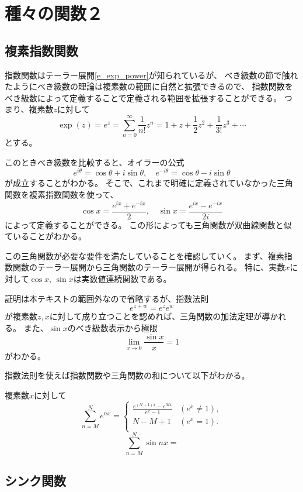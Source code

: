 
\chapter{種々の関数２}

\section{複素指数関数}

指数関数はテーラー展開\eqref{e_exp_power}が知られているが、
べき級数の節で触れたようにべき級数の理論は複素数の範囲に自然と拡張できるので、
指数関数をべき級数によって定義することで定義される範囲を拡張することができる。
つまり、複素数$z$に対して
$$
\exp(z) = e^z = \sum_{n = 0}^\infty \frac{1}{n!}z^n = 1+z+\frac{1}{2}z^2+\frac{1}{3!}z^3+\cdots
$$
とする。

このときべき級数を比較すると、オイラーの公式
$$
e^{i\theta} = \cos\theta+i\sin\theta,
\quad e^{-i\theta} = \cos\theta-i\sin\theta
$$
が成立することがわかる。
そこで、これまで明確に定義されていなかった三角関数を複素指数関数を使って、
$$
\cos x = \frac{e^{i x}+e^{-i x}}{2},
\quad \sin x = \frac{e^{i x}-e^{-i x}}{2 i}
$$
によって定義することができる。
この形によっても三角関数が双曲線関数と似ていることがわかる。

この三角関数が必要な要件を満たしていることを確認していく。
まず、複素指数関数のテーラー展開から三角関数のテーラー展開が得られる。
特に、実数$x$に対して$\cos x$, $\sin x$は実数値連続関数である。

証明は本テキストの範囲外なので省略するが、指数法則
$$
e^{z+w} = e^z e^w
$$
が複素数$z, x$に対して成り立つことを認めれば、三角関数の加法定理が導かれる。
また、$\sin x$のべき級数表示から極限
$$
\lim_{x \to 0}\frac{\sin x}{x} = 1
$$
がわかる。

指数法則を使えば指数関数や三角関数の和について以下がわかる。

\begin{proposition}
複素数$x$に対して
$$
\sum_{n = M}^N e^{n x} =
\begin{cases}
\frac{e^{(N+1)x}-e^{M x}}{e^x-1} & (e^x \ne 1), \\
N-M+1 & (e^x = 1). \\
\end{cases}
$$
$$
\sum_{n = M}^N \sin n x =
$$
\end{proposition}

\section{シンク関数}

